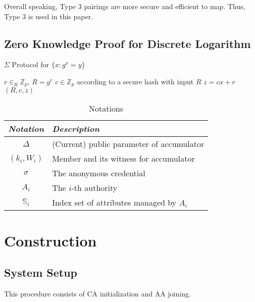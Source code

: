 \documentclass[journal]{IEEEtran}
\begin{document}
Overall speaking, Type 3 pairings are more secure and efficient to map. Thus, Type 3 is used in this paper.

\subsection{Zero Knowledge Proof for Discrete Logarithm}

\begin{algorithm}[h]
	\caption{$\Sigma$ Protocol for $\{x: g^x = y\}$}\label{alg:dlproof}
	\begin{algorithmic}[1]
		\STATE $r\in_R\mathbb{Z}_p$, $R = g^r$ 
		\STATE $c\in \mathbb{Z}_p $ according to a secure hash with input $R$
		\STATE $z = cx + r$
		\RETURN $(R, c, z)$
	\end{algorithmic}
\end{algorithm}

	\begin{table}[h]
		\caption{Notations}
		\label{table:notate}
		\centering
		\begin{tabular}{c|l}
			\hline
			\emph{Notation} & \emph{Description}\\
			\hline
			$\Delta$ & (Current) public parameter of accumulator\\
			$(k_i, W_i)$ & Member and its witness for accumulator\\
			$\sigma$ & The anonymous credential\\
			$A_i$ & The $i$-th authority\\
			$\mathbb{S}_i$ & Index set of attributes managed by $A_i$\\
		\end{tabular}
	\end{table}
	
\section{Construction}	
	\subsection{System Setup}
	This procedure consists of CA initialization and AA joining. 
\end{document}
